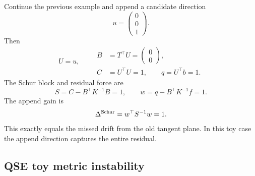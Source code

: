 \documentclass[10pt,twocolumn]{article}
\begin{document}
Continue the previous example and append a candidate direction
\begin{equation}
u=\begin{pmatrix}0\\0\\1\end{pmatrix}.
\end{equation}
Then
\begin{equation}
U=u,\qquad
\begin{aligned}
B&=T^\top U=\begin{pmatrix}0\\0\end{pmatrix},\\
C&=U^\top U=1,\qquad q=U^\top b=1.
\end{aligned}
\end{equation}
The Schur block and residual force are
\begin{equation}
S=C-B^\top K^{-1}B=1,
\qquad
w=q-B^\top K^{-1}f=1.
\end{equation}
The append gain is
\begin{equation}
\Delta^{\rm Schur}=w^\top S^{-1}w=1.
\end{equation}
This exactly equals the missed drift from the old tangent plane. In this toy case the append direction captures the entire residual.

\subsection{QSE toy metric instability}
\end{document}
